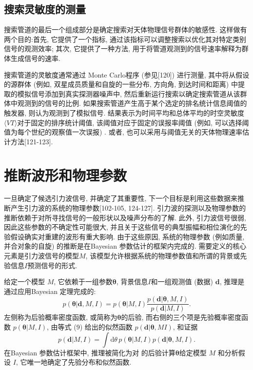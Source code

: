 \documentclass[a4paper]{\documentclassname}
\def\b{\boldsymbol}
\def\d{\mathrm{d}}
\theoremstyle{definition}
\begin{document}
\subsection{搜索灵敏度的测量}

搜索管道的最后一个组成部分是确定搜索对天体物理信号群体的敏感性. 这样做有两个目的:首先, 它提供了一个指标, 通过该指标可以调整搜索以优化其对特定类别信号的观测效率; 其次, 它提供了一种方法, 用于将管道观测到的信号速率解释为群体生成信号的速率. 

搜索管道的灵敏度通常通过 Monte Carlo程序 (参见[120]) 进行测量, 其中将从假设的源群体 (例如, 双星成员质量和自旋的一些分布, 方向角, 到达时间和距离) 中提取的模拟信号添加到真实探测器噪声中, 然后重新运行搜索以确定搜索管道从该群体中观测到的信号的比例. 如果搜索管道产生高于某个选定的排名统计信息阈值的触发器, 则认为观测到了模拟信号. 结果表示为时间平均和总体平均的时空灵敏度$\langle VT\rangle$对于固定的排序统计阈值, 该阈值对应于固定的误报率阈值 (例如, 可以选择阈值为每个世纪的观察值一次误报) . 或者, 也可以采用与阈值无关的天体物理速率估计方法[121-123]. 

\section{ 推断波形和物理参数}

一旦确定了候选引力波信号, 并确定了其重要性, 下一个目标是利用这些数据来推断产生引力波的系统的物理参数[102-105,  124-127]. 引力波的探测以及物理参数的推断依赖于对所寻找信号的一般形状以及噪声分布的了解. 此外, 引力波信号很弱, 因此这些参数的不确定性可能很大, 并且关于这些信号的典型振幅和相位演化的先验假设确实对重建的波形有重大影响. 由于这些原因, 系统的物理参数 (例如质量, 并合对象的自旋) 的推断是在Bayesian 参数估计的框架内完成的. 需要定义的核心元素是引力波信号的模型$M$, 该模型允许根据系统的物理参数值和所谓的背景或先验信息$I$预测信号的形式. 

给定一个模型 $M$, 它依赖于一组参数$\b{\theta}$, 背景信息$I$和一组观测值 (数据) ${\b d}$, 推理是通过应用Bayesian 定理完成的:
\begin{equation}
    p(\b{\theta}|\b{d},M,I)=p(\b{\theta}|M,I)\frac{p(\b{d}|\b{\theta},M,I)}{ p(\b{d}|M,I) } .
\end{equation}
左侧称为后验概率密度函数, 或简称为$\b{\theta}$的后验, 而右侧的三个项是先验概率密度函数 $p (\b{\theta} |M,  I) $, 由等式 (9) 给出的似然函数 $p ({\b d}|\b{\theta}, M I) $, 和证据
\begin{equation}
    p(\b{d}|M,I) =\int\d\theta\, p(\b{\theta}|M,I)p(\b{d}|\b{\theta},M,I).
\end{equation}
在Bayesian 参数估计框架中, 推理被简化为对 的后验计算$\b{\theta}$给定模型 $M$ 和分析假设 $I$, 它唯一地确定了先验分布和似然函数. 
\end{document}
